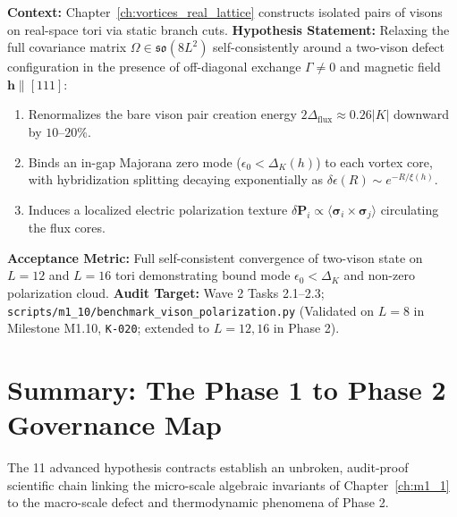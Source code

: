 \begin{contract}
\label{con:h11_vison_polarization_cloud}
\textbf{Context:} Chapter~\ref{ch:vortices_real_lattice} constructs isolated pairs of visons on real-space tori via static branch cuts.
\textbf{Hypothesis Statement:} Relaxing the full covariance matrix $\Omega \in \mathfrak{so}(8L^2)$ self-consistently around a two-vison defect configuration in the presence of off-diagonal exchange $\Gamma \neq 0$ and magnetic field $\mathbf{h} \parallel [111]$:
\begin{enumerate}
\item Renormalizes the bare vison pair creation energy $2\Delta_{\mathrm{flux}} \approx 0.26|K|$ downward by $10\text{--}20\%$.
\item Binds an in-gap Majorana zero mode ($\epsilon_0 < \Delta_K(h)$) to each vortex core, with hybridization splitting decaying exponentially as $\delta\epsilon(R) \sim e^{-R/\xi(h)}$.
\item Induces a localized electric polarization texture $\delta \mathbf{P}_i \propto \langle \boldsymbol{\sigma}_i \times \boldsymbol{\sigma}_j \rangle$ circulating the flux cores.
\end{enumerate}
\textbf{Acceptance Metric:} Full self-consistent convergence of two-vison state on $L=12$ and $L=16$ tori demonstrating bound mode $\epsilon_0 < \Delta_K$ and non-zero polarization cloud.
\textbf{Audit Target:} Wave 2 Tasks 2.1--2.3; \texttt{scripts/m1\_10/benchmark\_vison\_polarization.py} (Validated on $L=8$ in Milestone M1.10, \texttt{K-020}; extended to $L=12, 16$ in Phase 2).
\end{contract}

\section{Summary: The Phase 1 to Phase 2 Governance Map}
\label{sec:governance_summary_map}

The 11 advanced hypothesis contracts establish an unbroken, audit-proof scientific chain linking the micro-scale algebraic invariants of Chapter~\ref{ch:m1_1} to the macro-scale defect and thermodynamic phenomena of Phase 2.

